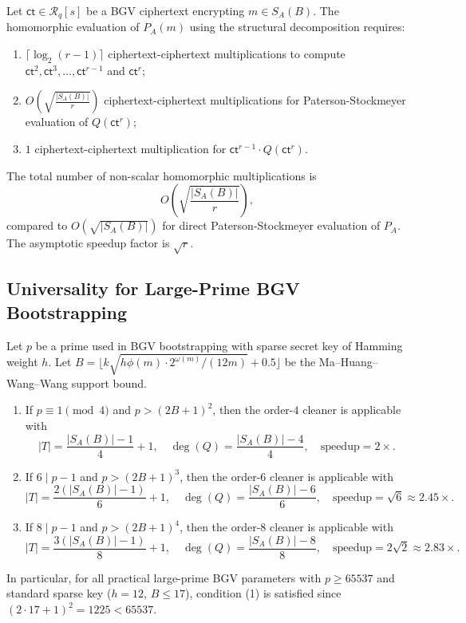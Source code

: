 \begin{theorem}\label{thm:evalcost}
Let $\mathsf{ct} \in \mathcal{R}_q[s]$ be a BGV ciphertext encrypting $m \in S_A(B)$.
The homomorphic evaluation of $P_A(m)$ using the structural decomposition requires:
\begin{enumerate}
\item $\lceil \log_2(r-1) \rceil$ ciphertext-ciphertext multiplications to compute $\mathsf{ct}^2, \mathsf{ct}^3, \ldots, \mathsf{ct}^{r-1}$ and $\mathsf{ct}^r$;
\item $O\!\left(\sqrt{\frac{|S_A(B)|}{r}}\right)$ ciphertext-ciphertext multiplications for Paterson-Stockmeyer evaluation of $Q(\mathsf{ct}^r)$;
\item $1$ ciphertext-ciphertext multiplication for $\mathsf{ct}^{r-1} \cdot Q(\mathsf{ct}^r)$.
\end{enumerate}
The total number of non-scalar homomorphic multiplications is
\[
O\!\left(\sqrt{\frac{|S_A(B)|}{r}}\right),
\]
compared to $O(\sqrt{|S_A(B)|})$ for direct Paterson-Stockmeyer evaluation of $P_A$.
The asymptotic speedup factor is $\sqrt{r}$.
\end{theorem}

\subsection{Universality for Large-Prime BGV Bootstrapping}

\begin{corollary}[Universality]\label{cor:universal}
Let $p$ be a prime used in BGV bootstrapping with sparse secret key of Hamming weight $h$.
Let $B = \lfloor k\sqrt{h\phi(m) \cdot 2^{\omega(m)} / (12m)} + 0.5 \rfloor$ be the Ma--Huang--Wang--Wang support bound.

\begin{enumerate}
\item If $p \equiv 1 \pmod{4}$ and $p > (2B+1)^2$, then the order-$4$ cleaner is applicable with
\[
|T| = \frac{|S_A(B)| - 1}{4} + 1, \quad \deg(Q) = \frac{|S_A(B)| - 4}{4}, \quad \text{speedup} = 2\times.
\]

\item If $6 \mid p-1$ and $p > (2B+1)^3$, then the order-$6$ cleaner is applicable with
\[
|T| = \frac{2(|S_A(B)| - 1)}{6} + 1, \quad \deg(Q) = \frac{|S_A(B)| - 6}{6}, \quad \text{speedup} = \sqrt{6} \approx 2.45\times.
\]

\item If $8 \mid p-1$ and $p > (2B+1)^4$, then the order-$8$ cleaner is applicable with
\[
|T| = \frac{3(|S_A(B)| - 1)}{8} + 1, \quad \deg(Q) = \frac{|S_A(B)| - 8}{8}, \quad \text{speedup} = 2\sqrt{2} \approx 2.83\times.
\]
\end{enumerate}

In particular, for all practical large-prime BGV parameters with $p \geq 65537$ and standard sparse key ($h = 12$, $B \leq 17$), condition (1) is satisfied since $(2 \cdot 17 + 1)^2 = 1225 < 65537$.
\end{corollary}


